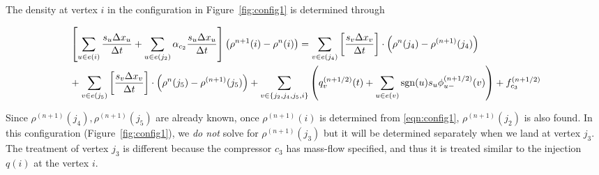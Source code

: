 \documentclass{amsart}
\DeclareMathOperator{\sgn}{sgn}
\begin{document}
The density at vertex $i$ in the configuration in Figure~\ref{fig:config1} is determined through

\begin{align}
& \left[ \sum_{u \in e(i)}\frac{s_{u} \Delta x_{u}}{\Delta t} + \sum_{u \in e(j_2)}\alpha_{c_2}\frac{s_{u} \Delta x_{u}}{\Delta t} \right] \left( \rho^{n+1}(i) - \rho^n(i) \right) =  \sum_{v \in e(j_4)}\left[\frac{s_{v} \Delta x_{v}}{\Delta t}\right] \cdot \left(\rho^{n}(j_4) - \rho^{(n+1)}(j_4) \right) \notag \\
& + \sum_{v \in e(j_5)}\left[\frac{s_{v} \Delta x_{v}}{\Delta t}\right] \cdot \left(\rho^{n}(j_5) - \rho^{(n+1)}(j_5) \right) 
+\sum_{v \in \{j_2, j_4, j_5, i\}} \left( q^{(n+1/2)}_{v}(t) + \sum_{u \in e(v)}\sgn(u) s_{u} \phi_{u-}^{(n+1/2)}(v) \right) + f^{(n+1/2)}_{c_3}
\label{eqn:config1}
\end{align}

Since $\rho^{(n+1)}(j_4), \rho^{(n+1)}(j_5)$ are already known, once $\rho^{(n+1)}(i)$ is determined from \eqref{eqn:config1}, $\rho^{(n+1)}(j_2)$ is also found. 
In this configuration (Figure~\ref{fig:config1}), we \emph{do not} solve for $\rho^{(n+1)}(j_3)$ but it will be determined separately when we land at vertex $j_3$. The treatment of vertex $j_3$ is different because the compressor $c_3$ has mass-flow specified, and thus it is treated similar to the injection $q(i)$  at the vertex $i$.
\end{document}
